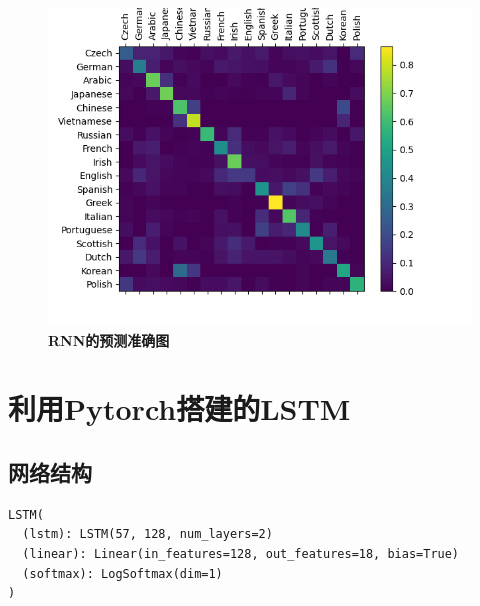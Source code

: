 \documentclass{article}
\begin{document}
\begin{figure}[H]
   \centering
   \includegraphics[scale= 0.5]{1.png}
   \caption{\textbf{RNN的预测准确图}}
\end{figure}

\section{利用Pytorch搭建的LSTM}
\subsection{网络结构}
\begin{lstlisting}
LSTM(
  (lstm): LSTM(57, 128, num_layers=2)
  (linear): Linear(in_features=128, out_features=18, bias=True)
  (softmax): LogSoftmax(dim=1)
)
\end{lstlisting}
\end{document}
